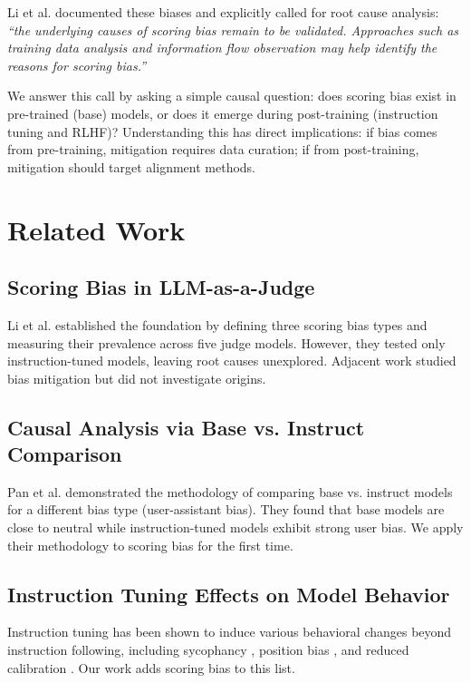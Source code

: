 \documentclass[11pt,twocolumn]{article}
\begin{document}
Li et al. \cite{li2025scoring} documented these biases and explicitly called for root cause analysis: \textit{``the underlying causes of scoring bias remain to be validated. Approaches such as training data analysis and information flow observation may help identify the reasons for scoring bias.''}

We answer this call by asking a simple causal question: does scoring bias exist in pre-trained (base) models, or does it emerge during post-training (instruction tuning and RLHF)? Understanding this has direct implications: if bias comes from pre-training, mitigation requires data curation; if from post-training, mitigation should target alignment methods.

\section{Related Work}
\label{sec:related}

\subsection{Scoring Bias in LLM-as-a-Judge}
Li et al. \cite{li2025scoring} established the foundation by defining three scoring bias types and measuring their prevalence across five judge models. However, they tested only instruction-tuned models, leaving root causes unexplored. Adjacent work \cite{soumik2026judging,yang2025reliable} studied bias mitigation but did not investigate origins.

\subsection{Causal Analysis via Base vs. Instruct Comparison}
Pan et al. \cite{pan2025user} demonstrated the methodology of comparing base vs. instruct models for a different bias type (user-assistant bias). They found that base models are close to neutral while instruction-tuned models exhibit strong user bias. We apply their methodology to scoring bias for the first time.

\subsection{Instruction Tuning Effects on Model Behavior}
Instruction tuning has been shown to induce various behavioral changes beyond instruction following, including sycophancy \cite{cotra2023}, position bias \cite{shi2025judging}, and reduced calibration \cite{kadavath2022}. Our work adds scoring bias to this list.
\end{document}

